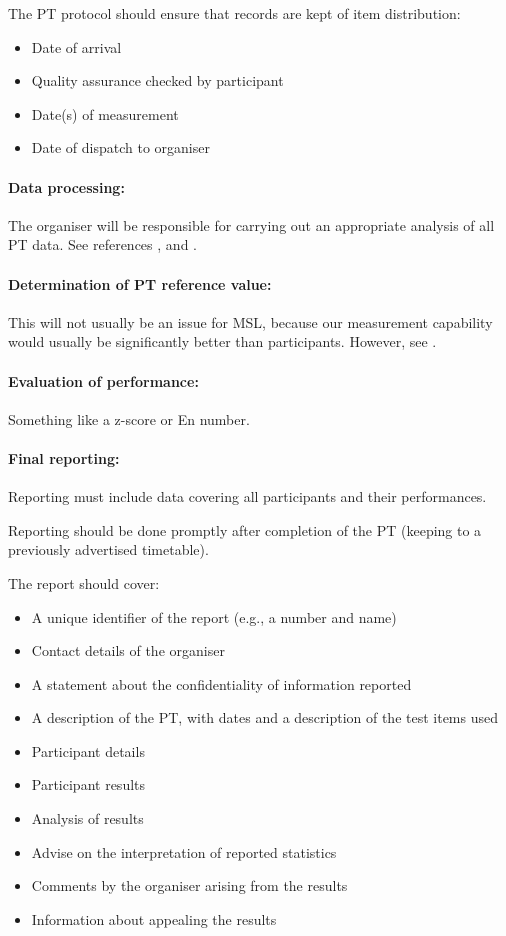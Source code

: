 The PT protocol should ensure that records are kept of item distribution: 
\begin{itemize}
	\item Date of arrival
	\item Quality assurance checked by participant
	\item Date(s) of measurement
	\item Date of dispatch to organiser
\end{itemize}
 
\paragraph{Data processing:}
The organiser will be responsible for carrying out an appropriate analysis of all PT data. See references \cite{Milde:2020}, \cite{BSI:repeatability} and \cite{BSI:proficiency}.

\paragraph{Determination of PT reference value:}
This will not usually be an issue for MSL, because our measurement capability would usually be significantly better than participants. However, see \cite{Milde:2020}.
 
\paragraph{Evaluation of performance:}
Something like a z-score or En number.

\paragraph{Final reporting:}
Reporting must include data covering all participants and their performances. 

Reporting should be done promptly after completion of the PT (keeping to a previously advertised timetable).

The report should cover:

\begin{itemize}
	\item A unique identifier of the report (e.g., a number and name) 
	\item Contact details of the organiser
	\item A statement about the confidentiality of information reported
	\item A description of the PT, with dates and a description of the test items used
	\item Participant details
	\item Participant results
	\item Analysis of results
	\item Advise on the interpretation of reported statistics 
	\item Comments by the organiser arising from the results
	\item Information about appealing the results 
\end{itemize} 

